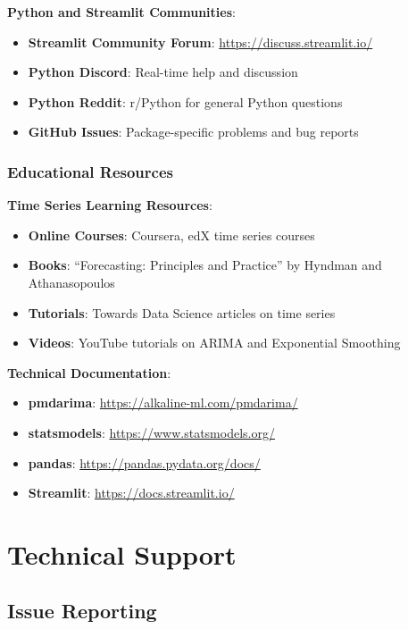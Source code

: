 \textbf{Python and Streamlit Communities}:
\begin{itemize}
    \item \textbf{Streamlit Community Forum}: \url{https://discuss.streamlit.io/}
    \item \textbf{Python Discord}: Real-time help and discussion
    \item \textbf{Python Reddit}: r/Python for general Python questions
    \item \textbf{GitHub Issues}: Package-specific problems and bug reports
\end{itemize}

\subsubsection{Educational Resources}

\textbf{Time Series Learning Resources}:
\begin{itemize}
    \item \textbf{Online Courses}: Coursera, edX time series courses
    \item \textbf{Books}: ``Forecasting: Principles and Practice'' by Hyndman and Athanasopoulos
    \item \textbf{Tutorials}: Towards Data Science articles on time series
    \item \textbf{Videos}: YouTube tutorials on ARIMA and Exponential Smoothing
\end{itemize}

\textbf{Technical Documentation}:
\begin{itemize}
    \item \textbf{pmdarima}: \url{https://alkaline-ml.com/pmdarima/}
    \item \textbf{statsmodels}: \url{https://www.statsmodels.org/}
    \item \textbf{pandas}: \url{https://pandas.pydata.org/docs/}
    \item \textbf{Streamlit}: \url{https://docs.streamlit.io/}
\end{itemize}

\section{Technical Support}

\subsection{Issue Reporting}

